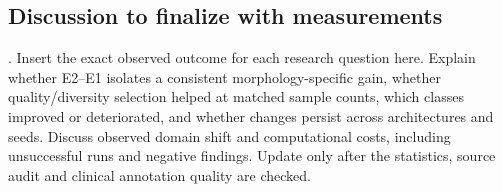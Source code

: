 \subsection{Discussion to finalize with measurements}
\noindent\Pending. Insert the exact observed outcome for each research question here. Explain whether E2--E1 isolates a consistent morphology-specific gain, whether quality/diversity selection helped at matched sample counts, which classes improved or deteriorated, and whether changes persist across architectures and seeds. Discuss observed domain shift and computational costs, including unsuccessful runs and negative findings. Update only after the statistics, source audit and clinical annotation quality are checked.
